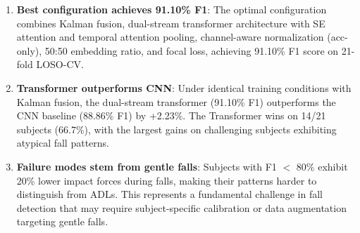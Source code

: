 \begin{enumerate}
    \item \textbf{Best configuration achieves 91.10\% F1}: The optimal configuration combines Kalman fusion, dual-stream transformer architecture with SE attention and temporal attention pooling, channel-aware normalization (acc-only), 50:50 embedding ratio, and focal loss, achieving 91.10\% F1 score on 21-fold LOSO-CV.

    \item \textbf{Transformer outperforms CNN}: Under identical training conditions with Kalman fusion, the dual-stream transformer (91.10\% F1) outperforms the CNN baseline (88.86\% F1) by +2.23\%. The Transformer wins on 14/21 subjects (66.7\%), with the largest gains on challenging subjects exhibiting atypical fall patterns.

    \item \textbf{Failure modes stem from gentle falls}: Subjects with F1 $<$ 80\% exhibit 20\% lower impact forces during falls, making their patterns harder to distinguish from ADLs. This represents a fundamental challenge in fall detection that may require subject-specific calibration or data augmentation targeting gentle falls.
\end{enumerate}

